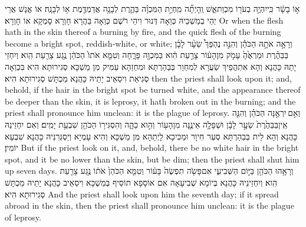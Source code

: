 {א֣וֹ בָשָׂ֔ר כִּֽי\maqqaf יִהְיֶ֥ה בְעֹר֖וֹ מִכְוַת\maqqaf אֵ֑שׁ וְֽהָיְתָ֞ה מִֽחְיַ֣ת הַמִּכְוָ֗ה בַּהֶ֛רֶת לְבָנָ֥ה אֲדַמְדֶּ֖מֶת א֥וֹ לְבָנָֽה׃}
{אוֹ אֱנָשׁ אֲרֵי יְהֵי בְמַשְׁכֵּיהּ כְּוַאָה דְּנוּר וִיהֵי רֹשֶׁם כְּוַאָה בַּהֲרָא חָוְרָא סָמְקָא אוֹ חָוְרָא׃}
{Or when the flesh hath in the skin thereof a burning by fire, and the quick flesh of the burning become a bright spot, reddish-white, or white;}{}
{וְרָאָ֣ה אֹתָ֣הּ הַכֹּהֵ֡ן וְהִנֵּ֣ה נֶהְפַּךְ֩ שֵׂעָ֨ר לָבָ֜ן בַּבַּהֶ֗רֶת וּמַרְאֶ֙הָ֙ עָמֹ֣ק מִן\maqqaf הָע֔וֹר צָרַ֣עַת הִ֔וא בַּמִּכְוָ֖ה פָּרָ֑חָה וְטִמֵּ֤א אֹתוֹ֙ הַכֹּהֵ֔ן נֶ֥גַע צָרַ֖עַת הִֽוא׃}
{וְיִחְזֵי יָתַהּ כָּהֲנָא וְהָא אִתְהֲפֵיךְ שַׂעֲרָא לְמִחְוַר בְּבַהַרְתָּא וּמִחְזַהָא עַמִּיק מִן מַשְׁכָּא סְגִירוּתָא הִיא בִּכְוַאָה סְגִיאַת וִיסַאֵיב יָתֵיהּ כָּהֲנָא מַכְתָּשׁ סְגִירוּתָא הִיא׃}
{then the priest shall look upon it; and, behold, if the hair in the bright spot be turned white, and the appearance thereof be deeper than the skin, it is leprosy, it hath broken out in the burning; and the priest shall pronounce him unclean: it is the plague of leprosy.}{}
{וְאִ֣ם \legarmeh  יִרְאֶ֣נָּה הַכֹּהֵ֗ן וְהִנֵּ֤ה אֵֽין\maqqaf בַּבַּהֶ֙רֶת֙ שֵׂעָ֣ר לָבָ֔ן וּשְׁפָלָ֥ה אֵינֶ֛נָּה מִן\maqqaf הָע֖וֹר וְהִ֣וא כֵהָ֑ה וְהִסְגִּיר֥וֹ הַכֹּהֵ֖ן שִׁבְעַ֥ת יָמִֽים׃}
{וְאִם יִחְזֵינַהּ כָּהֲנָא וְהָא לֵית בְּבַהַרְתָּא סְעַר חִיוָר וּמַכִּיכָא לָיְתַהָא מִן מַשְׁכָּא וְהִיא עָמְיָא וְיַסְגְּרִנֵּיהּ כָּהֲנָא שִׁבְעָא יוֹמִין׃}
{But if the priest look on it, and, behold, there be no white hair in the bright spot, and it be no lower than the skin, but be dim; then the priest shall shut him up seven days.}{}
{וְרָאָ֥הוּ הַכֹּהֵ֖ן בַּיּ֣וֹם הַשְּׁבִיעִ֑י אִם\maqqaf פָּשֹׂ֤ה תִפְשֶׂה֙ בָּע֔וֹר וְטִמֵּ֤א הַכֹּהֵן֙ אֹת֔וֹ נֶ֥גַע צָרַ֖עַת הִֽוא׃}
{וְיִחְזֵינֵיהּ כָּהֲנָא בְּיוֹמָא שְׁבִיעָאָה אִם אוֹסָפָא תוֹסֵיף בְּמַשְׁכָּא וִיסַאֵיב כָּהֲנָא יָתֵיהּ מַכְתָּשׁ סְגִירוּתָא הִיא׃}
{And the priest shall look upon him the seventh day; if it spread abroad in the skin, then the priest shall pronounce him unclean: it is the plague of leprosy.}{}
